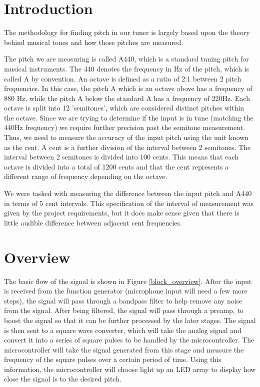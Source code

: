\documentclass[12pt]{article}
\begin{document}
\newpage
\section{Introduction}


The methodology for finding pitch in our tuner is largely based upon the theory behind musical tones
and how those pitches are measured.

The pitch we are measuring is called A440, which is a standard tuning pitch for musical instruments.
The 440 denotes the frequency in Hz of the pitch, which is called A by convention. An octave is defined
as a ratio of 2:1 between 2 pitch frequencies. In this case, the pitch A which is an octave above has a
frequency of 880 Hz, while the pitch A below the standard A has a frequency of 220Hz. Each octave
is split into 12 'semitones', which are considered distinct pitches within the octave. Since we are
trying to determine if the input is in tune (matching the 440Hz frequency) we require further precision
past the semitone measurement. Thus, we need to measure the accuracy of the input pitch using the
unit known as the cent. A cent is a further division of the interval between 2 semitones. The interval
between 2 semitones is divided into 100 cents. This means that each octave is divided into a total of
1200 cents and that the cent represents a different range of frequency depending on the octave.

We were tasked with measuring the difference between the input pitch and A440 in terms of 5 cent
intervals. This specification of the interval of measurement was given by the project requirements, but
it does make sense given that there is little audible difference between adjacent cent frequencies.

\section{Overview}
The basic flow of the signal is shown in Figure \ref{block_overview}. After the input is received from the function 
generator (microphone input will need a few more steps), the signal will pass through a bandpass filter to help
remove any noise from the signal. After being filtered, the signal will pass through a preamp, to boost
the signal so that it can be further processed by the later stages. The signal is then sent to a square
wave converter, which will take the analog signal and convert it into a series of square pulses to be
handled by the microcontroller. The microcontroller
will take the signal generated from this stage and measure the frequency of the square pulses over a certain
period of time. Using this information, the microcontroller will choose light up an LED array to display how close the
signal is to the desired pitch.
\end{document}
